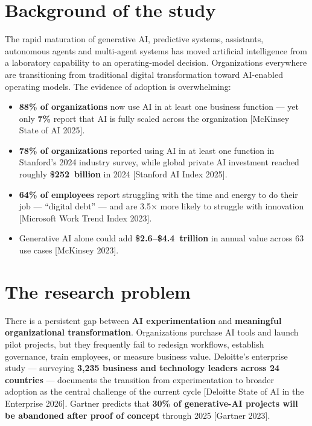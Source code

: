 
\section{Background of the study}

The rapid maturation of generative AI, predictive systems, assistants,
autonomous agents and multi-agent systems has moved artificial intelligence
from a laboratory capability to an operating-model decision. Organizations
everywhere are transitioning from traditional digital transformation toward
AI-enabled operating models. The evidence of adoption is overwhelming:

\begin{itemize}
  \item \textbf{88\% of organizations} now use AI in at least one business
        function — yet only \textbf{7\%} report that AI is fully scaled across
        the organization [McKinsey State of AI 2025].
  \item \textbf{78\% of organizations} reported using AI in at least one
        function in Stanford's 2024 industry survey, while global private AI
        investment reached roughly \textbf{\$252~billion} in 2024
        [Stanford AI Index 2025].
  \item \textbf{64\% of employees} report struggling with the time and energy
        to do their job — ``digital debt'' — and are 3.5$\times$ more likely
        to struggle with innovation [Microsoft Work Trend Index 2023].
  \item Generative AI alone could add \textbf{\$2.6--\$4.4~trillion} in annual
        value across 63 use cases [McKinsey 2023].
\end{itemize}

\section{The research problem}

There is a persistent gap between \textbf{AI experimentation} and
\textbf{meaningful organizational transformation}. Organizations purchase AI
tools and launch pilot projects, but they frequently fail to redesign
workflows, establish governance, train employees, or measure business value.
Deloitte's enterprise study — surveying \textbf{3,235 business and technology
leaders across 24 countries} — documents the transition from experimentation
to broader adoption as the central challenge of the current cycle
[Deloitte State of AI in the Enterprise 2026]. Gartner predicts that
\textbf{30\% of generative-AI projects will be abandoned after proof of
concept} through 2025 [Gartner 2023].

